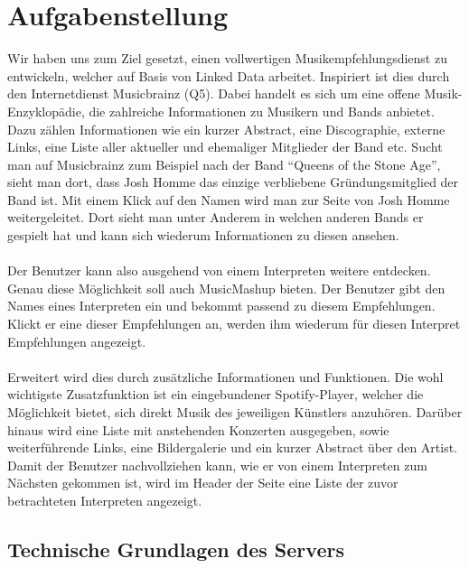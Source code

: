 \section{Aufgabenstellung}


Wir haben uns zum Ziel gesetzt, einen vollwertigen Musikempfehlungsdienst zu entwickeln, welcher auf Basis von Linked Data arbeitet. Inspiriert ist dies durch den Internetdienst Musicbrainz (Q5). Dabei handelt es sich um eine offene Musik-Enzyklopädie, die zahlreiche Informationen zu Musikern und Bands anbietet. Dazu zählen Informationen wie ein kurzer Abstract, eine Discographie, externe Links, eine Liste aller aktueller und ehemaliger Mitglieder der Band etc. Sucht man auf Musicbrainz zum Beispiel nach der Band “Queens of the Stone Age”, sieht man dort, dass Josh Homme das einzige verbliebene Gründungsmitglied der Band ist. Mit einem Klick auf den Namen wird man zur Seite von Josh Homme weitergeleitet. Dort sieht man unter Anderem in welchen anderen Bands er gespielt hat und kann sich wiederum Informationen zu diesen ansehen.

\paragraph{} Der Benutzer kann also ausgehend von einem Interpreten weitere entdecken. Genau diese Möglichkeit soll auch MusicMashup bieten. Der Benutzer gibt den Names eines Interpreten ein und bekommt passend zu diesem Empfehlungen. Klickt er eine dieser Empfehlungen an, werden ihm wiederum für diesen Interpret Empfehlungen angezeigt. 


\paragraph{} Erweitert wird dies durch zusätzliche Informationen und Funktionen. Die wohl wichtigste Zusatzfunktion ist ein eingebundener Spotify-Player, welcher die Möglichkeit bietet, sich direkt Musik des jeweiligen Künstlers anzuhören. Darüber hinaus wird eine Liste mit anstehenden Konzerten ausgegeben, sowie weiterführende Links, eine Bildergalerie und ein kurzer Abstract über den Artist. Damit der Benutzer nachvollziehen kann, wie er von einem Interpreten zum Nächsten gekommen ist, wird im Header der Seite eine Liste der zuvor betrachteten Interpreten angezeigt.

\subsection{Technische Grundlagen des Servers}

